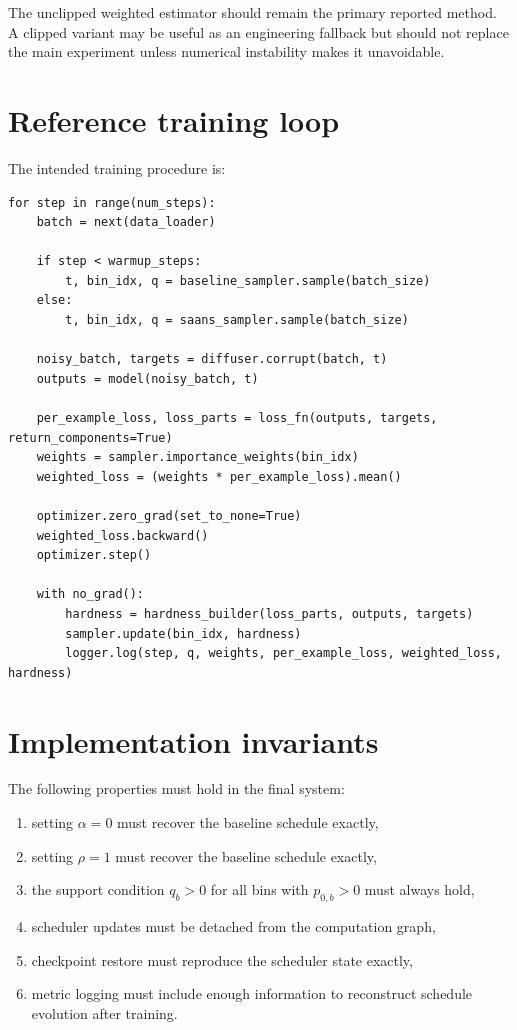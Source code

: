 \documentclass[11pt]{report}
\begin{document}
The unclipped weighted estimator should remain the primary reported method. A clipped variant may be useful as an engineering fallback but should not replace the main experiment unless numerical instability makes it unavoidable.

\section{Reference training loop}

The intended training procedure is:

\begin{lstlisting}[style=codeblock]
for step in range(num_steps):
    batch = next(data_loader)

    if step < warmup_steps:
        t, bin_idx, q = baseline_sampler.sample(batch_size)
    else:
        t, bin_idx, q = saans_sampler.sample(batch_size)

    noisy_batch, targets = diffuser.corrupt(batch, t)
    outputs = model(noisy_batch, t)

    per_example_loss, loss_parts = loss_fn(outputs, targets, return_components=True)
    weights = sampler.importance_weights(bin_idx)
    weighted_loss = (weights * per_example_loss).mean()

    optimizer.zero_grad(set_to_none=True)
    weighted_loss.backward()
    optimizer.step()

    with no_grad():
        hardness = hardness_builder(loss_parts, outputs, targets)
        sampler.update(bin_idx, hardness)
        logger.log(step, q, weights, per_example_loss, weighted_loss, hardness)
\end{lstlisting}

\section{Implementation invariants}

The following properties must hold in the final system:

\begin{enumerate}[leftmargin=2em]
    \item setting $\alpha = 0$ must recover the baseline schedule exactly,
    \item setting $\rho = 1$ must recover the baseline schedule exactly,
    \item the support condition $q_b > 0$ for all bins with $p_{0,b} > 0$ must always hold,
    \item scheduler updates must be detached from the computation graph,
    \item checkpoint restore must reproduce the scheduler state exactly,
    \item metric logging must include enough information to reconstruct schedule evolution after training.
\end{enumerate}
\end{document}
